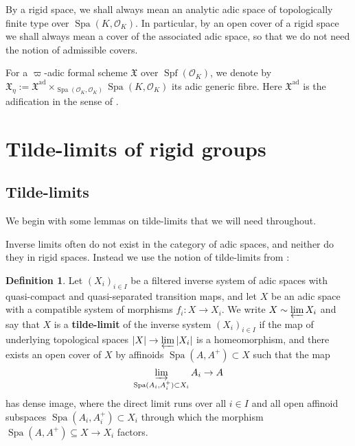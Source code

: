 \documentclass[10pt,oneside]{amsart}
\theoremstyle{definition}
\newtheorem{definition}[theorem]{Definition}
\begin{document}
	By a rigid space, we shall always mean an analytic adic space of topologically finite type over $\operatorname{Spa}(K,\mathcal O_K)$. 
	In particular, by an open cover of a rigid space we shall always mean a cover of the associated adic space, so that we do not need the notion of admissible covers.
	
	For a $\varpi$-adic formal scheme $\mathfrak X$ over $\operatorname{Spf}(\mathcal O_K)$, we denote by $\mathfrak X_\eta:=\mathfrak X^{\mathrm{ad}}\times_{\operatorname{Spa}(\mathcal O_K,\mathcal O_K)}\operatorname{Spa}(K,\mathcal O_K)$ its adic generic fibre. Here $\mathfrak X^{\mathrm{ad}}$ is the adification in the sense of \cite{SW}.


	
	\section{Tilde-limits of rigid groups} \label{section:tilde_limit}
  
	

		\subsection{Tilde-limits} 
	We begin with some lemmas on tilde-limits that we will need throughout.
		
	Inverse limits often do not exist in the category of adic spaces, and neither do they in rigid spaces. Instead we use the notion of tilde-limits from \cite[Definition 2.4.2]{huber2013etale}:	
	\begin{definition} 
Let $(X_i)_{i\in I}$ be a filtered inverse system of adic spaces with quasi-compact and quasi-separated transition maps, and let $X$ be an adic space with a compatible system of morphisms $f_i\colon X \rightarrow X_i$. We write $X \sim \varprojlim X_i$ and say that $X$ is a \textbf{tilde-limit} of the inverse system $(X_i)_{i\in I}$ if the map of underlying topological spaces $|X| \rightarrow \varprojlim |X_i|$ is a homeomorphism, and there exists an open cover of $X$ by affinoids $\operatorname{Spa} (A, A^+) \subset X$ such that the map 
$$ \varinjlim_{\operatorname{Spa}(A_i, A_i^+) \subset X_i} A_i \rightarrow A$$
has dense image, where the direct limit runs over all $i\in I$ and all open affinoid subspaces $\operatorname{Spa}(A_i, A_i^+) \subset X_i$ through which the morphism $\operatorname{Spa}(A, A^+) \subseteq X\rightarrow X_i$ factors.
	\end{definition}
	
\end{document}
